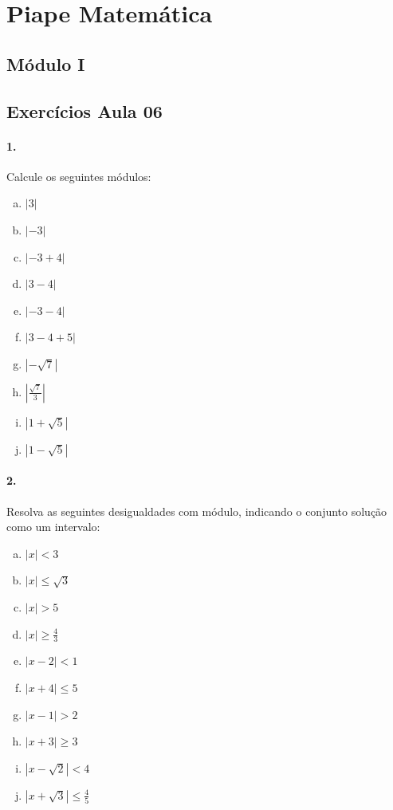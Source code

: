 \documentclass[a4paper,twocolumn,12pt]{article}
\begin{document}
 
\section*{Piape Matemática} 
 
\subsection*{Módulo I}
\subsection*{Exercícios Aula 06}

\paragraph{1.} Calcule os seguintes módulos:
\begin{enumerate}[a)]
\item $|3|$
\item $|-3|$
\item $|-3 + 4|$
\item $|3 - 4|$
\item $|-3 - 4|$
\item $|3 - 4 + 5|$ 
\item $|-\sqrt{7}|$
\item $\left|\displaystyle\frac{\sqrt{7}}{3}\right|$
\item $|1+\sqrt{5}|$
\item $|1-\sqrt{5}|$
\end{enumerate}

\paragraph*{2.} Resolva as seguintes desigualdades com módulo, indicando o conjunto solução como um intervalo:

\begin{enumerate}[a)]
\item $|x| < 3$
\item $|x| \leq \sqrt{3}$
\item $|x| > 5$
\item $|x| \geq \frac{4}{3}$
\item $|x - 2| < 1$
\item $|x + 4| \leq 5$
\item $|x - 1| > 2$
\item $|x + 3| \geq 3$
\item $|x - \sqrt{2}|  < 4$
\item $|x + \sqrt{3}|  \le \frac{4}{5}$
\end{enumerate}
\end{document}
